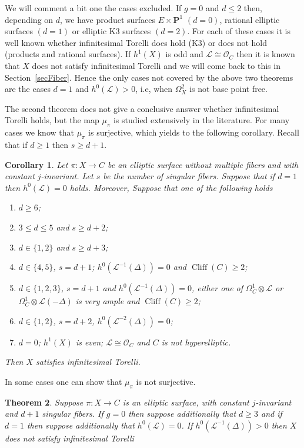\documentclass{amsart}
\newcommand{\Ps}{\mathbf{P}}
\newcommand{\cL}{\mathcal{L}}
\newcommand{\cO}{\mathcal{O}}
\newtheorem{theorem}{Theorem}[section]
\newtheorem{corollary}[theorem]{Corollary}
\theoremstyle{definition}
\theoremstyle{remark}
\DeclareMathOperator{\Cliff}{Cliff}
\begin{document}
We will comment a bit one the cases excluded.
If $g=0$ and $d\leq 2$ then, depending on $d$, we have product surfaces $E\times \Ps^1$ $(d=0)$, rational elliptic surfaces  $(d=1)$ or elliptic K3 surfaces $(d=2)$. For each of these cases it is well known whether infinitesimal Torelli does hold (K3) or does not hold (products and rational surfaces). If $h^1(X)$ is odd and $\cL\cong \cO_C$ then it is known that $X$ does not satisfy infinitesimal Torelli \cite[Section 8]{Sai} and we will come back to this in Section~\ref{secFiber}. Hence the only cases not covered by the above two theorems are the cases $d=1$ and $h^0(\cL)>0$, i.e, when $\Omega^2_X$ is not base point free.

The second theorem does not give a conclusive answer whether infinitesimal Torelli holds, but the map $\mu_\pi$ is studied extensively in the literature. 
For many cases we know that $\mu_\pi$ is surjective, which yields to the following corollary. Recall that if $d\geq 1$ then $s\geq d+1$.

\begin{corollary} Let $\pi: X\to C$ be an elliptic surface without multiple fibers and with constant $j$-invariant. Let $s$ be the number of singular fibers. Suppose that if $d=1$ then $h^0(\cL)=0$ holds. Moreover, Suppose that one of the following holds
\begin{enumerate}
\item $d\geq 6$;
\item $3\leq d\leq 5$ and $s\geq d+2$;
\item $d\in \{1,2\}$ and $s\geq d+3$;
\item  $d\in \{4,5\}$, $s= d+1$; $h^0(\cL^{-1}(\Delta))=0$ and $\Cliff(C)\geq 2$;
\item $d\in \{1,2,3\}$, $s= d+1$ and $h^0(\cL^{-1}(\Delta))=0$, either one of $\Omega^1_C\otimes \cL$ or $\Omega^1_C\otimes \cL(-\Delta)$ is very ample and  $\Cliff(C)\geq 2$;
\item  $d\in \{1,2\}$, $s=d+2$, $h^0(\cL^{-2}(\Delta))=0$;
\item $d=0$; $h^1(X)$ is even; $\cL\cong \cO_C$ and $C$ is not hyperelliptic.
\end{enumerate}
Then $X$ satisfies infinitesimal Torelli.
\end{corollary}

In some cases one can show that $\mu_\pi$ is not surjective.
\begin{theorem} Suppose $\pi:X\to C$ is an elliptic surface, with constant $j$-invariant and $d+1$ singular fibers. If $g=0$ then suppose additionally that $d\geq 3$ and if $d=1$ then suppose additionally that $h^0(\cL)=0$.  If $h^0(\cL^{-1}(\Delta))>0$ then $X$ does not satisfy infinitesimal Torelli
\end{theorem}
\end{document}
